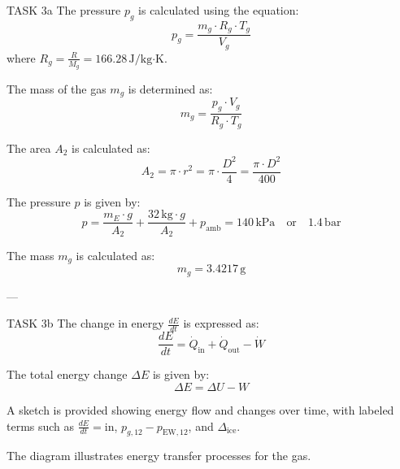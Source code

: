 TASK 3a  
The pressure \( p_g \) is calculated using the equation:  
\[
p_g = \frac{m_g \cdot R_g \cdot T_g}{V_g}
\]  
where \( R_g = \frac{R}{M_g} = 166.28 \, \text{J/kg·K} \).  

The mass of the gas \( m_g \) is determined as:  
\[
m_g = \frac{p_g \cdot V_g}{R_g \cdot T_g}
\]  

The area \( A_2 \) is calculated as:  
\[
A_2 = \pi \cdot r^2 = \pi \cdot \frac{D^2}{4} = \frac{\pi \cdot D^2}{400}
\]  

The pressure \( p \) is given by:  
\[
p = \frac{m_E \cdot g}{A_2} + \frac{32 \, \text{kg} \cdot g}{A_2} + p_{\text{amb}} = 140 \, \text{kPa} \quad \text{or} \quad 1.4 \, \text{bar}
\]  

The mass \( m_g \) is calculated as:  
\[
m_g = 3.4217 \, \text{g}
\]  

---

TASK 3b  
The change in energy \( \frac{dE}{dt} \) is expressed as:  
\[
\frac{dE}{dt} = \dot{Q}_{\text{in}} + \dot{Q}_{\text{out}} - \dot{W}
\]  

The total energy change \( \Delta E \) is given by:  
\[
\Delta E = \Delta U - W
\]  

A sketch is provided showing energy flow and changes over time, with labeled terms such as \( \frac{dE}{dt} = \text{in} \), \( p_{g,12} - p_{\text{EW},12} \), and \( \Delta_{\text{ice}} \).  

The diagram illustrates energy transfer processes for the gas.